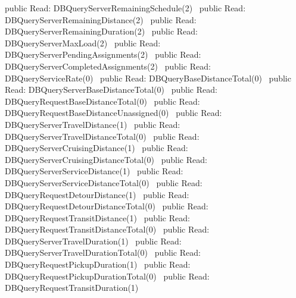 public \LA{}Read: DBQueryServerRemainingSchedule(2)~{\nwtagstyle{}}\RA{}
public \LA{}Read: DBQueryServerRemainingDistance(2)~{\nwtagstyle{}}\RA{}
public \LA{}Read: DBQueryServerRemainingDuration(2)~{\nwtagstyle{}}\RA{}
public \LA{}Read: DBQueryServerMaxLoad(2)~{\nwtagstyle{}}\RA{}
public \LA{}Read: DBQueryServerPendingAssignments(2)~{\nwtagstyle{}}\RA{}
public \LA{}Read: DBQueryServerCompletedAssignments(2)~{\nwtagstyle{}}\RA{}
public \LA{}Read: DBQueryServiceRate(0)~{\nwtagstyle{}}\RA{}
public \LA{}Read: DBQueryBaseDistanceTotal(0)~{\nwtagstyle{}}\RA{}
public \LA{}Read: DBQueryServerBaseDistanceTotal(0)~{\nwtagstyle{}}\RA{}
public \LA{}Read: DBQueryRequestBaseDistanceTotal(0)~{\nwtagstyle{}}\RA{}
public \LA{}Read: DBQueryRequestBaseDistanceUnassigned(0)~{\nwtagstyle{}}\RA{}
public \LA{}Read: DBQueryServerTravelDistance(1)~{\nwtagstyle{}}\RA{}
public \LA{}Read: DBQueryServerTravelDistanceTotal(0)~{\nwtagstyle{}}\RA{}
public \LA{}Read: DBQueryServerCruisingDistance(1)~{\nwtagstyle{}}\RA{}
public \LA{}Read: DBQueryServerCruisingDistanceTotal(0)~{\nwtagstyle{}}\RA{}
public \LA{}Read: DBQueryServerServiceDistance(1)~{\nwtagstyle{}}\RA{}
public \LA{}Read: DBQueryServerServiceDistanceTotal(0)~{\nwtagstyle{}}\RA{}
public \LA{}Read: DBQueryRequestDetourDistance(1)~{\nwtagstyle{}}\RA{}
public \LA{}Read: DBQueryRequestDetourDistanceTotal(0)~{\nwtagstyle{}}\RA{}
public \LA{}Read: DBQueryRequestTransitDistance(1)~{\nwtagstyle{}}\RA{}
public \LA{}Read: DBQueryRequestTransitDistanceTotal(0)~{\nwtagstyle{}}\RA{}
public \LA{}Read: DBQueryServerTravelDuration(1)~{\nwtagstyle{}}\RA{}
public \LA{}Read: DBQueryServerTravelDurationTotal(0)~{\nwtagstyle{}}\RA{}
public \LA{}Read: DBQueryRequestPickupDuration(1)~{\nwtagstyle{}}\RA{}
public \LA{}Read: DBQueryRequestPickupDurationTotal(0)~{\nwtagstyle{}}\RA{}
public \LA{}Read: DBQueryRequestTransitDuration(1)~{\nwtagstyle{}}\RA{}

